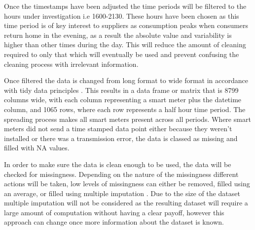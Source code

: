 Once the timestamps have been adjusted the time periods will be filtered to the hours under investigation i.e 1600-2130. These hours have been chosen as this time period is of key interest to suppliers as consumption peaks when consumers return home in the evening, as a result the absolute value and variability is higher than other times during the day. This will reduce the amount of cleaning required to only that which will eventually be used and prevent confusing the cleaning process with irrelevant information. 

Once filtered the data is changed from long format to wide format in accordance with tidy data principles \cite{wickham2014}. This results in a data frame or matrix that is 8799 columns wide, with each column representing a smart meter plus the datetime column, and 1065 rows, where each row represents a half hour time period. The spreading process makes all smart meters present across all periods. Where smart meters did not send a time stamped data point either because they weren't installed or there was a transmission error, the data is classed as missing and filled with NA values.

In order to make sure the data is clean enough to be used, the data will be checked for missingness. Depending on the nature of the missingness different actions will be taken, low levels of missingness can either be removed, filled using an average, or filled using multiple imputation \cite{lee2013}. Due to the size of the dataset multiple imputation will not be considered as the resulting dataset will require a large amount of computation without having a clear payoff, however this approach can change once more information about the dataset is known. 

